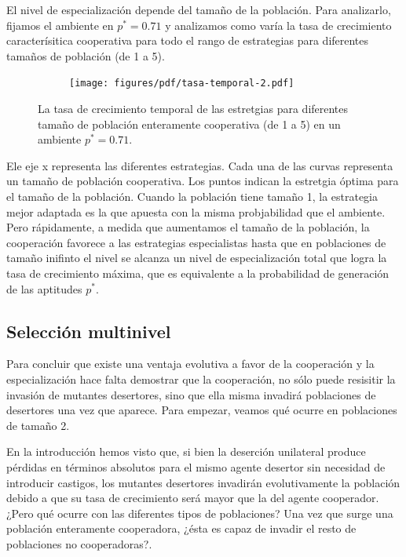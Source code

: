 \documentclass[a4paper,10pt]{article}
\begin{document}
El nivel de especialización depende del tamaño de la población.
Para analizarlo, fijamos el ambiente en $p^* = 0.71$ y analizamos como varía la tasa de crecimiento caracterísitica cooperativa para todo el rango de estrategias para diferentes tamaños de población (de 1 a 5).
%
\begin{figure}[H]
    \centering
    \begin{subfigure}[b]{0.66\textwidth}
    \texttt{[image: figures/pdf/tasa-temporal-2.pdf]}
    \end{subfigure}
    \caption{
    La tasa de crecimiento temporal de las estretgias para diferentes tamaño de población enteramente cooperativa (de 1 a 5) en un ambiente $p^*=0.71$.
    }
    \label{fig:multilevel-selection-1}
\end{figure}
%
Ele eje x representa las diferentes estrategias.
Cada una de las curvas representa un tamaño de población cooperativa.
Los puntos indican la estretgia óptima para el tamaño de la población.
Cuando la población tiene tamaño 1, la estrategia mejor adaptada es la que apuesta con la misma probjabilidad que el ambiente.
Pero rápidamente, a medida que aumentamos el tamaño de la población, la cooperación favorece a las estrategias especialistas hasta que en poblaciones de tamaño inifinto el nivel se alcanza un nivel de especialización total que logra la tasa de crecimiento máxima, que es equivalente a la probabilidad de generación de las aptitudes $p^*$.

\subsection{Selección multinivel}

Para concluir que existe una ventaja evolutiva a favor de la cooperación y la especialización hace falta demostrar que la cooperación, no sólo puede resisitir la invasión de mutantes desertores, sino que ella misma invadirá poblaciones de desertores una vez que aparece.
Para empezar, veamos qué ocurre en poblaciones de tamaño 2.

% 

En la introducción hemos visto que, si bien la deserción unilateral produce pérdidas en términos absolutos para el mismo agente desertor sin necesidad de introducir castigos, los mutantes desertores invadirán evolutivamente la población debido a que su tasa de crecimiento será mayor que la del agente cooperador.
¿Pero qué ocurre con las diferentes tipos de poblaciones?
Una vez que surge una población enteramente cooperadora, ¿ésta es capaz de invadir el resto de poblaciones no cooperadoras?.
\end{document}
